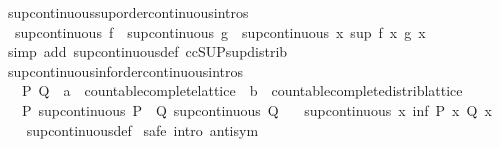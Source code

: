 \begin{isabellebody}
\isamarkupfalse%
%
\endisatagproof
{\isafoldproof}%
%
\isadelimproof
\isanewline
%
\endisadelimproof
\isanewline
{}\isamarkupfalse%
\ sup{\isacharunderscore}continuous{\isacharunderscore}sup{\isacharbrackleft}order{\isacharunderscore}continuous{\isacharunderscore}intros{\isacharbrackright}{\isacharcolon}\isanewline
\ \ {\isachardoublequoteopen}sup{\isacharunderscore}continuous\ f\ {\isasymLongrightarrow}\ sup{\isacharunderscore}continuous\ g\ {\isasymLongrightarrow}\ sup{\isacharunderscore}continuous\ {\isacharparenleft}{\isasymlambda}x{\isachardot}\ sup\ {\isacharparenleft}f\ x{\isacharparenright}\ {\isacharparenleft}g\ x{\isacharparenright}{\isacharparenright}{\isachardoublequoteclose}\isanewline
%
\isadelimproof
\ \ %
\endisadelimproof
%
\isatagproof
{}\isamarkupfalse%
\ {\isacharparenleft}simp\ add{\isacharcolon}\ sup{\isacharunderscore}continuous{\isacharunderscore}def\ ccSUP{\isacharunderscore}sup{\isacharunderscore}distrib{\isacharparenright}%
\endisatagproof
{\isafoldproof}%
%
\isadelimproof
\isanewline
%
\endisadelimproof
\isanewline
{}\isamarkupfalse%
\ sup{\isacharunderscore}continuous{\isacharunderscore}inf{\isacharbrackleft}order{\isacharunderscore}continuous{\isacharunderscore}intros{\isacharbrackright}{\isacharcolon}\isanewline
\ \ \ P\ Q\ {\isacharcolon}{\isacharcolon}\ {\isachardoublequoteopen}{\isacharprime}a\ {\isacharcolon}{\isacharcolon}\ countable{\isacharunderscore}complete{\isacharunderscore}lattice\ {\isasymRightarrow}\ {\isacharprime}b\ {\isacharcolon}{\isacharcolon}\ countable{\isacharunderscore}complete{\isacharunderscore}distrib{\isacharunderscore}lattice{\isachardoublequoteclose}\isanewline
\ \ \ P{\isacharcolon}\ {\isachardoublequoteopen}sup{\isacharunderscore}continuous\ P{\isachardoublequoteclose}\ \ Q{\isacharcolon}\ {\isachardoublequoteopen}sup{\isacharunderscore}continuous\ Q{\isachardoublequoteclose}\isanewline
\ \ \ {\isachardoublequoteopen}sup{\isacharunderscore}continuous\ {\isacharparenleft}{\isasymlambda}x{\isachardot}\ inf\ {\isacharparenleft}P\ x{\isacharparenright}\ {\isacharparenleft}Q\ x{\isacharparenright}{\isacharparenright}{\isachardoublequoteclose}\isanewline
%
\isadelimproof
\ \ %
\endisadelimproof
%
\isatagproof
{}\isamarkupfalse%
\ sup{\isacharunderscore}continuous{\isacharunderscore}def\isanewline
{}\isamarkupfalse%
\ {\isacharparenleft}safe\ intro{\isacharbang}{\isacharcolon}\ antisym{\isacharparenright}\isanewline
\ \ \isamarkupfalse%

\end{isabellebody}
